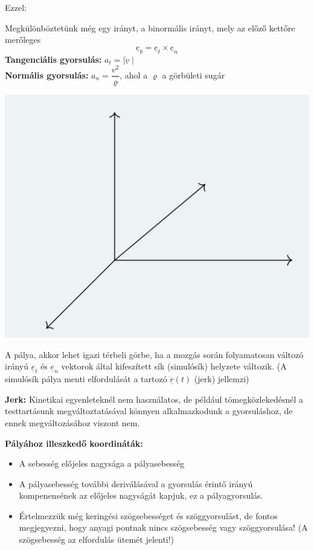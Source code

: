 Ezzel:
\begin{center}
\end{center}
Megkülönböztetünk még egy irányt, a binormális irányt, mely az előző kettőre merőleges
$$\underline{e}_b = \underline{e}_t \times  \underline{e}_n$$
\textbf{Tangenciális gyorsulás:} \(a_t = \mid \underline{\dot{v}} \mid \)\\
\textbf{Normális gyorsulás:} \(a_n = \dfrac{v^2}{\varrho}\), ahol a \(\varrho\) a görbületi sugár
\newpage
\begin{multicols}{2}
    \includegraphics[scale = 0.7]{Ea_gyak_1/2.png}
    \columnbreak

    A pálya, akkor lehet igazi térbeli görbe, ha a mozgás során folyamatosan változó irányú \(\underline{e}_t\) és \(\underline{e}_n\) vektorok által kifeszített sík (simulósík) helyzete változik. (A simulósík pálya menti elfordulását a tartozó \(\underline{\dddot{r}}(t)\) (jerk) jellemzi)
\end{multicols}
\begin{tcolorbox}[colback=MidnightBlue!5!white,colframe=MidnightBlue!60!black,title= Definíció]
\textbf{Jerk:} Kinetikai egyenleteknél nem használatos, de például tömegközlekedésnél a testtartásunk megváltoztatásával könnyen alkalmazkodunk a gyorsuláshoz, de ennek megváltozásához viszont nem.
\end{tcolorbox}
 \textbf{Pályához illeszkedő koordináták:}
\begin{itemize}
    \item A sebesség előjeles nagysága a pályasebesség
    \item A pályasebesség további deriválásával a gyorsulás érintő irányú kompenensének az előjeles nagyságát kapjuk, ez a pályagyorsulás.
    \item Értelmezzük még keringési szögsebességet és szöggyorsulást, de fontos megjegyezni, hogy anyagi pontnak nincs szögsebesség vagy szöggyorsulása! (A szögsebesség az elfordulás ütemét jelenti!)
\end{itemize}

